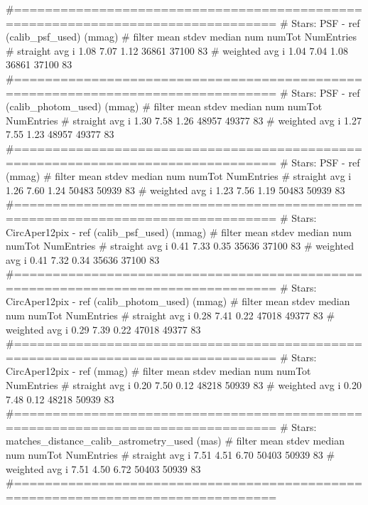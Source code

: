 \begin{code}
#================================================================================
# Stars: PSF - ref (calib_psf_used) (mmag)
#                filter    mean    stdev    median     num      numTot  NumEntries
# straight avg       i     1.08     7.07     1.12     36861     37100        83
# weighted avg       i     1.04     7.04     1.08     36861     37100        83
#================================================================================
# Stars:  PSF - ref (calib_photom_used) (mmag)
#                filter    mean    stdev    median     num      numTot  NumEntries
# straight avg       i     1.30     7.58     1.26     48957     49377        83
# weighted avg       i     1.27     7.55     1.23     48957     49377        83
#================================================================================
# Stars: PSF - ref (mmag)
#                filter    mean    stdev    median     num      numTot  NumEntries
# straight avg       i     1.26     7.60     1.24     50483     50939        83
# weighted avg       i     1.23     7.56     1.19     50483     50939        83
#================================================================================
# Stars: CircAper12pix - ref (calib_psf_used) (mmag)
#                filter    mean    stdev    median     num      numTot  NumEntries
# straight avg       i     0.41     7.33     0.35     35636     37100        83
# weighted avg       i     0.41     7.32     0.34     35636     37100        83
#================================================================================
# Stars:  CircAper12pix - ref (calib_photom_used) (mmag)
#                filter    mean    stdev    median     num      numTot  NumEntries
# straight avg       i     0.28     7.41     0.22     47018     49377        83
# weighted avg       i     0.29     7.39     0.22     47018     49377        83
#================================================================================
# Stars: CircAper12pix - ref (mmag)
#                filter    mean    stdev    median     num      numTot  NumEntries
# straight avg       i     0.20     7.50     0.12     48218     50939        83
# weighted avg       i     0.20     7.48     0.12     48218     50939        83
#================================================================================
# Stars: matches_distance_calib_astrometry_used (mas)
#                filter    mean    stdev    median     num      numTot  NumEntries
# straight avg       i     7.51     4.51     6.70     50403     50939        83
# weighted avg       i     7.51     4.50     6.72     50403     50939        83
#================================================================================

\end{code}
